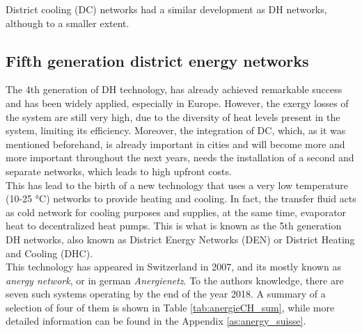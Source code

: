 \documentclass{article}
\begin{document}
District cooling (DC) networks had a similar development as DH networks, although to a smaller extent. 

\subsection{Fifth generation district energy networks}
The 4th generation of DH technology, has already achieved remarkable success and has been widely applied, especially in Europe. However, the exergy losses of the system are still very high, due to the diversity of heat levels present in the system, limiting its efficiency. Moreover, the integration of DC, which, as it was mentioned beforehand, is already important in cities and will become more and more important throughout the next years, needs the installation of a second and separate networks, which leads to high upfront costs. \\
This has lead to the birth of a new technology that uses a very low temperature (10-25 \si{\celsius}) networks to provide heating and cooling. In fact, the transfer fluid acts as cold network for cooling purposes and supplies, at the same time, evaporator heat to decentralized heat pumps. This is what is known as the 5th generation DH networks, also known as District Energy Networks (DEN) or District Heating and Cooling (DHC).\\

This technology has appeared in Switzerland in 2007, and its mostly known as \textit{anergy network}, or in german \textit{Anergienetz}. To the authors knowledge, there are seven such systems operating by the end of the year 2018\cite{energieschweizFallbeispieleThermischeNetze2018}. A summary of a selection of four of them is shown in Table \ref{tab:anergieCH_sum}, while more detailed information can be found in the Appendix \ref{as:anergy_suisse}.


\end{document}

